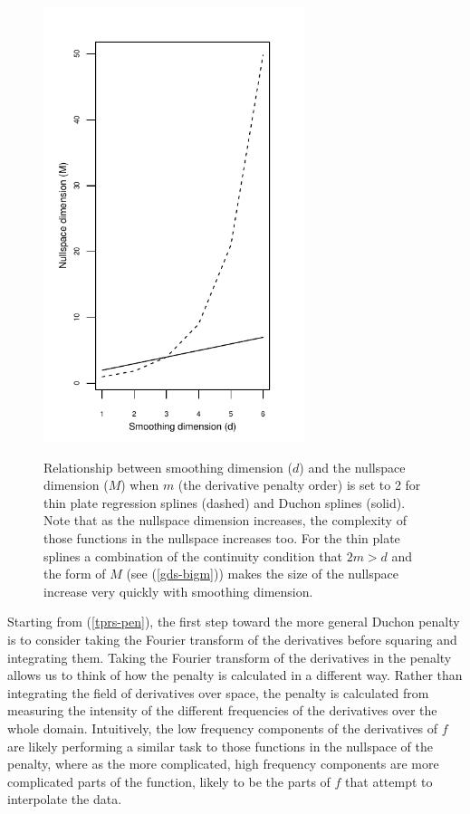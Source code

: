 \documentclass[useAMS, referee]{biom}
\begin{document}
\begin{figure}
\centering
\includegraphics[width=3in]{figs/nullspace-dim.pdf} \\
\caption{Relationship between smoothing dimension ($d$) and the nullspace dimension ($M$) when $m$ (the derivative penalty order) is set to 2 for thin plate regression splines (dashed) and Duchon splines (solid). Note that as the nullspace dimension increases, the complexity of those functions in the nullspace increases too. For the thin plate splines a combination of the continuity condition that $2m>d$ and the form of $M$ (see (\ref{gds-bigm})) makes the size of the nullspace increase very quickly with smoothing dimension.}
\label{nullspace-dim}
\end{figure}

Starting from (\ref{tprs-pen}), the first step toward the more general Duchon penalty is to consider taking the Fourier transform of the derivatives before squaring and integrating them. Taking the Fourier transform of the derivatives in the penalty allows us to think of how the penalty is calculated in a different way. Rather than integrating the field of derivatives over space, the penalty is calculated from measuring the intensity of the different frequencies of the derivatives over the whole domain. Intuitively, the low frequency components of the derivatives of $f$ are likely performing a similar task to those functions in the nullspace of the penalty, where as the more complicated, high frequency components are more complicated parts of the function, likely to be the parts of $f$ that attempt to interpolate the data.
\end{document}
